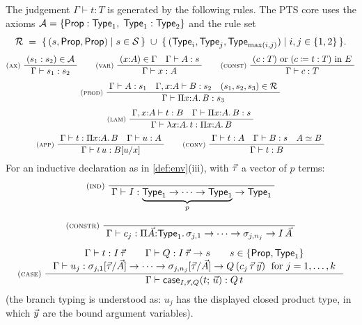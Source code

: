 \begin{definition}[Typing]
\label{def:typing}
The judgement $\Gamma \vdash t : T$ is generated by the following
rules.  The PTS core uses the axioms $\mathcal{A} = \{\mathsf{Prop} :
\mathsf{Type}_1,\; \mathsf{Type}_1 : \mathsf{Type}_2\}$ and the rule set
\[
  \mathcal{R} \;=\;
  \{\,(s, \mathsf{Prop}, \mathsf{Prop}) \mid s \in \mathcal{S}\,\}
  \;\cup\;
  \{\,(\mathsf{Type}_i, \mathsf{Type}_j, \mathsf{Type}_{\max(i,j)}) \mid i,j \in \{1,2\}\,\} .
\]
\begin{gather*}
\textsc{\footnotesize (ax)}\;\dfrac{\;(s_1 : s_2) \in \mathcal{A}\;}{\;\Gamma \vdash s_1 : s_2\;}
\qquad
\textsc{\footnotesize (var)}\;\dfrac{\;(x{:}A) \in \Gamma \quad \Gamma \vdash A : s\;}{\;\Gamma \vdash x : A\;}
\qquad
\textsc{\footnotesize (const)}\;\dfrac{\;(c : T) \text{ or } (c \coloneqq t : T) \text{ in } E\;}{\;\Gamma \vdash c : T\;}
\\[1ex]
\textsc{\footnotesize (prod)}\;\dfrac{\;\Gamma \vdash A : s_1 \quad \Gamma, x{:}A \vdash B : s_2 \quad (s_1,s_2,s_3) \in \mathcal{R}\;}{\;\Gamma \vdash \Pi x{:}A.\,B : s_3\;}
\\[1ex]
\textsc{\footnotesize (lam)}\;\dfrac{\;\Gamma, x{:}A \vdash t : B \quad \Gamma \vdash \Pi x{:}A.\,B : s\;}{\;\Gamma \vdash \lambda x{:}A.\,t : \Pi x{:}A.\,B\;}
\\[1ex]
\textsc{\footnotesize (app)}\;\dfrac{\;\Gamma \vdash t : \Pi x{:}A.\,B \quad \Gamma \vdash u : A\;}{\;\Gamma \vdash t\,u : B[u/x]\;}
\qquad
\textsc{\footnotesize (conv)}\;\dfrac{\;\Gamma \vdash t : A \quad \Gamma \vdash B : s \quad A \simeq B\;}{\;\Gamma \vdash t : B\;}
\end{gather*}
For an inductive declaration as in \cref{def:env}(iii), with
$\vec{\tau}$ a vector of $p$ terms:
\begin{gather*}
\textsc{\footnotesize (ind)}\;\dfrac{\;\;}{\;\Gamma \vdash I : \underbrace{\mathsf{Type}_1 \to \cdots \to \mathsf{Type}_1}_{p} \to \mathsf{Type}_1\;}
\\[1ex]
\textsc{\footnotesize (constr)}\;\dfrac{\;\;}{\;\Gamma \vdash c_j : \Pi \vec{A}{:}\mathsf{Type}_1.\,\sigma_{j,1} \to \cdots \to \sigma_{j,n_j} \to I\,\vec{A}\;}
\\[1ex]
\textsc{\footnotesize (case)}\;\dfrac{\;\begin{array}{c}
  \Gamma \vdash t : I\,\vec{\tau} \qquad
  \Gamma \vdash Q : I\,\vec{\tau} \to s \qquad s \in \{\mathsf{Prop}, \mathsf{Type}_1\} \\
  \Gamma \vdash u_j : \sigma_{j,1}[\vec{\tau}/\vec{A}] \to \cdots \to
     \sigma_{j,n_j}[\vec{\tau}/\vec{A}] \to Q\,(c_j\,\vec{\tau}\,\vec{y})
     \;\text{ for } j = 1, \ldots, k
  \end{array}\;}{\;\Gamma \vdash \mathsf{case}_{I,\vec{\tau},Q}(t;\,\vec{u}) : Q\,t\;}
\end{gather*}
(the branch typing is understood as: $u_j$ has the displayed closed
product type, in which $\vec{y}$ are the bound argument variables).

\end{definition}
